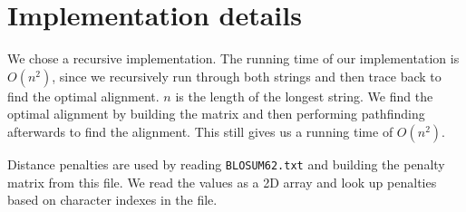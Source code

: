 \documentclass{tufte-handout}
\begin{document}
  \section{Implementation details}

  We chose a recursive implementation. The running time of our implementation is $O(n^2)$, since we recursively run through both strings and then trace back to find the optimal alignment. $n$ is the length of the longest string.
We find the optimal alignment by building the matrix and then performing pathfinding afterwards to find the alignment. This still gives us a running time of $O(n^2)$.

  Distance penalties are used by reading \texttt{BLOSUM62.txt} and building the penalty matrix from this file. We read the values as a 2D array and look up penalties based on character indexes in the file.
\end{document}
